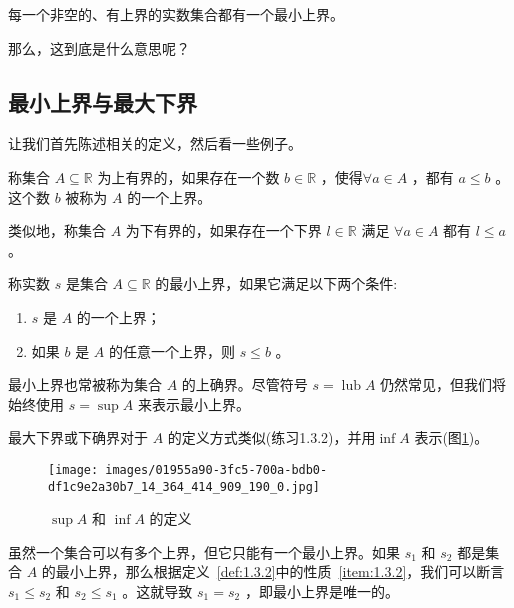 \begingroup
\renewcommand{\theThm}{} %
\begin{Axm}[完备性公理]
  每一个非空的、有上界的实数集合都有一个最小上界。
\end{Axm}
\endgroup

\addtocounter{Thm}{-1}

那么，这到底是什么意思呢？

\subsection{最小上界与最大下界}

让我们首先陈述相关的定义，然后看一些例子。
\begin{Def}
  \label{def:1.3.1}
称集合 \(A \subseteq  \mathbb{R}\) 为上有界的，如果存在一个数 \(b \in  \mathbb{R}\) ，使得\( \forall a \in  A\) ，都有 \(a \leq  b\) 。这个数 \(b\) 被称为 \(A\) 的一个上界。

类似地，称集合 \(A\) 为下有界的，如果存在一个下界 \(l \in  \mathbb{R}\) 满足 \(\forall a \in  A\) 都有 \(l \leq  a\)。  
\end{Def}

\begin{Def}
  \label{def:1.3.2}
称实数 \(s\) 是集合 \(A \subseteq  \mathbb{R}\) 的最小上界，如果它满足以下两个条件:
\begin{enumerate}[label = (\roman*)]
\item\label{item:1.3.1}  \(s\) 是 \(A\) 的一个上界；
\item\label{item:1.3.2} 如果 \(b\) 是 \(A\) 的任意一个上界，则 \(s \leq  b\) 。
\end{enumerate}
最小上界也常被称为集合 \(A\) 的上确界。尽管符号 \(s = \operatorname{lub}A\) 仍然常见，但我们将始终使用 \(s = \sup A\) 来表示最小上界。  
\end{Def}

最大下界或下确界对于 \(A\) 的定义方式类似(练习1.3.2)，并用\(\inf A\) 表示(图\ref{fig:1.3})。

\begin{figure}[h]
  \centering
  \texttt{[image: images/01955a90-3fc5-700a-bdb0-df1c9e2a30b7\_14\_364\_414\_909\_190\_0.jpg]}
  \caption{ \(\sup A\) 和 \(\inf A\) 的定义}
  \label{fig:1.3}
\end{figure}

虽然一个集合可以有多个上界，但它只能有一个最小上界。如果 \({s}_{1}\) 和 \({s}_{2}\) 都是集合 \(A\) 的最小上界，那么根据定义~\ref{def:1.3.2}中的性质~\ref{item:1.3.2}，我们可以断言 \({s}_{1} \leq  {s}_{2}\) 和 \({s}_{2} \leq  {s}_{1}\) 。这就导致 \({s}_{1} = {s}_{2}\) ，即最小上界是唯一的。

